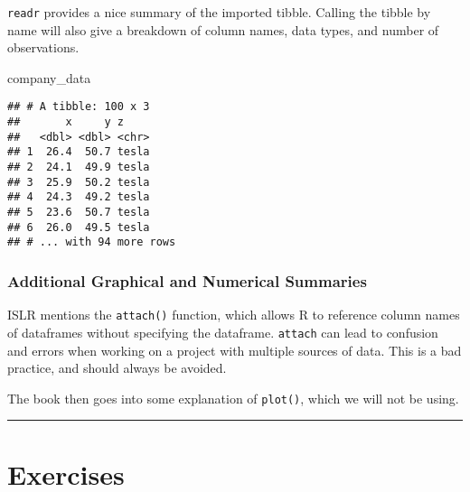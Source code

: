 \documentclass[]{book}
\newenvironment{Shaded}{\begin{snugshade}}{\end{snugshade}}
\newcommand{\NormalTok}[1]{#1}
\theoremstyle{definition}
\theoremstyle{definition}
\theoremstyle{definition}
\theoremstyle{remark}
\begin{document}
\texttt{readr} provides a nice summary of the imported tibble. Calling
the tibble by name will also give a breakdown of column names, data
types, and number of observations.

\begin{Shaded}
\begin{Highlighting}[]
\NormalTok{company_data}
\end{Highlighting}
\end{Shaded}

\begin{verbatim}
## # A tibble: 100 x 3
##       x     y z    
##   <dbl> <dbl> <chr>
## 1  26.4  50.7 tesla
## 2  24.1  49.9 tesla
## 3  25.9  50.2 tesla
## 4  24.3  49.2 tesla
## 5  23.6  50.7 tesla
## 6  26.0  49.5 tesla
## # ... with 94 more rows
\end{verbatim}

\subsubsection{Additional Graphical and Numerical
Summaries}\label{additional-graphical-and-numerical-summaries}

ISLR mentions the \texttt{attach()} function, which allows R to
reference column names of dataframes without specifying the dataframe.
\texttt{attach} can lead to confusion and errors when working on a
project with multiple sources of data. This is a bad practice, and
should always be avoided.

The book then goes into some explanation of \texttt{plot()}, which we
will not be using.

\begin{center}\rule{0.5\linewidth}{\linethickness}\end{center}

\section{Exercises}\label{exercises}
\end{document}
